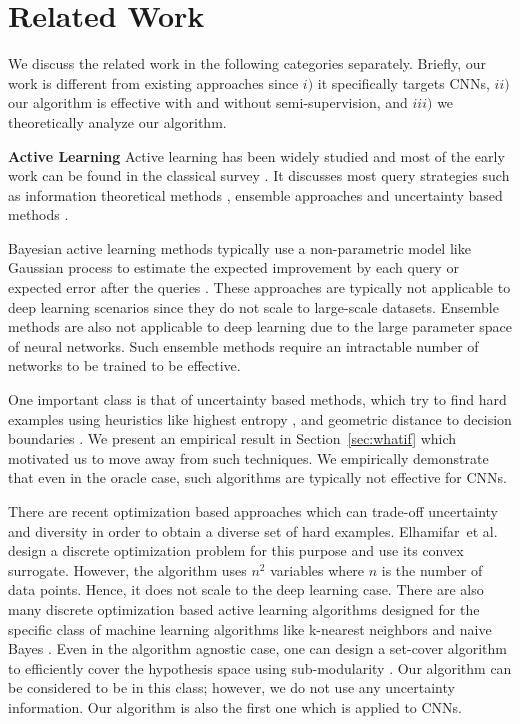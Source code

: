 \documentclass{article}
\begin{document}
\section{Related Work}
We discuss the related work in the following categories separately. Briefly, our work is different from existing approaches since $i)$ it specifically targets CNNs, $ii)$ our algorithm is effective with and without semi-supervision, and $iii)$ we theoretically analyze our algorithm.

\noindent\textbf{Active Learning}
Active learning has been widely studied and most of the early work can be found in the classical survey \cite{settles2010active}. It discusses most query strategies such as information theoretical methods \cite{mackay1992information}, ensemble approaches \cite{mccallumzy1998employing, freund1997selective} and uncertainty based methods \cite{tong2001support,lewissequential,joshi2009multi,li2013adaptive}. %

Bayesian active learning methods typically use a non-parametric model like Gaussian process to estimate the expected improvement by each query \cite{kapoor2007active} or expected error after the queries \cite{roy2001toward}. These approaches are typically not applicable to deep learning scenarios since they do not scale to large-scale datasets. Ensemble methods are also not applicable to deep learning due to the large parameter space of neural networks. Such ensemble methods require an intractable number of networks to be trained to be effective.

One important class is that of uncertainty based methods, which try to find hard examples using heuristics like highest entropy \cite{joshi2009multi}, and geometric distance to decision boundaries \cite{tong2001support,brinker2003incorporating}. We present an empirical result in Section~\ref{sec:whatif} which motivated us to move away from such techniques. We empirically demonstrate that even in the oracle case, such algorithms are typically not effective for CNNs.

There are recent optimization based approaches which can trade-off uncertainty and diversity in order to obtain a diverse set of hard examples. Elhamifar~et al.  \cite{elhamifar2013convex} design a discrete optimization problem for this purpose and use its convex surrogate. However, the algorithm uses $n^2$ variables where $n$ is the number of data points. Hence, it does not scale to the deep learning case. There are also many discrete optimization based active learning algorithms designed for the specific class of machine learning algorithms like k-nearest neighbors and naive Bayes \cite{wei2015submodularity}. Even in the algorithm agnostic case, one can design a set-cover algorithm to efficiently cover the hypothesis space using sub-modularity \cite{guillory2010interactive, golovin2011adaptive}. Our algorithm can be considered to be in this class; however, we do not use any uncertainty information. Our algorithm is also the first one which is applied to CNNs.
\end{document}
